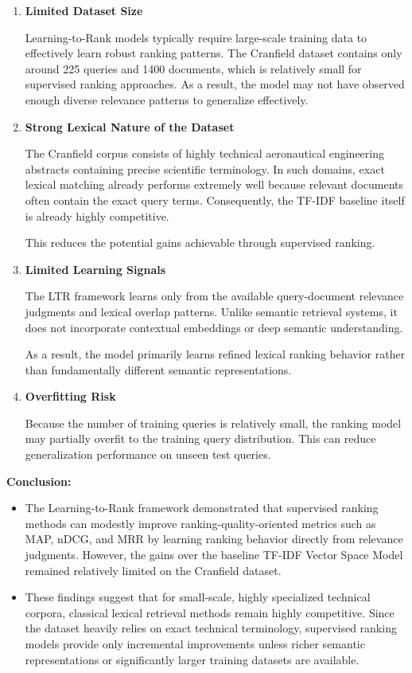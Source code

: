 \documentclass{article}
\begin{document}
\begin{enumerate}
    \item \textbf{Limited Dataset Size}

    Learning-to-Rank models typically require large-scale training data to effectively learn robust ranking patterns. The Cranfield dataset contains only around 225 queries and 1400 documents, which is relatively small for supervised ranking approaches. As a result, the model may not have observed enough diverse relevance patterns to generalize effectively.

    \item \textbf{Strong Lexical Nature of the Dataset}

    The Cranfield corpus consists of highly technical aeronautical engineering abstracts containing precise scientific terminology. In such domains, exact lexical matching already performs extremely well because relevant documents often contain the exact query terms. Consequently, the TF-IDF baseline itself is already highly competitive.

    This reduces the potential gains achievable through supervised ranking.

    \item \textbf{Limited Learning Signals}

    The LTR framework learns only from the available query-document relevance judgments and lexical overlap patterns. Unlike semantic retrieval systems, it does not incorporate contextual embeddings or deep semantic understanding.

    As a result, the model primarily learns refined lexical ranking behavior rather than fundamentally different semantic representations.

    \item \textbf{Overfitting Risk}

    Because the number of training queries is relatively small, the ranking model may partially overfit to the training query distribution. This can reduce generalization performance on unseen test queries.
\end{enumerate}

\textbf{Conclusion:}
\begin{itemize}
\item The Learning-to-Rank framework demonstrated that supervised ranking methods can modestly improve ranking-quality-oriented metrics such as MAP, nDCG, and MRR by learning ranking behavior directly from relevance judgments. However, the gains over the baseline TF-IDF Vector Space Model remained relatively limited on the Cranfield dataset.

\item These findings suggest that for small-scale, highly specialized technical corpora, classical lexical retrieval methods remain highly competitive. Since the dataset heavily relies on exact technical terminology, supervised ranking models provide only incremental improvements unless richer semantic representations or significantly larger training datasets are available.
\end{itemize}
\end{document}
